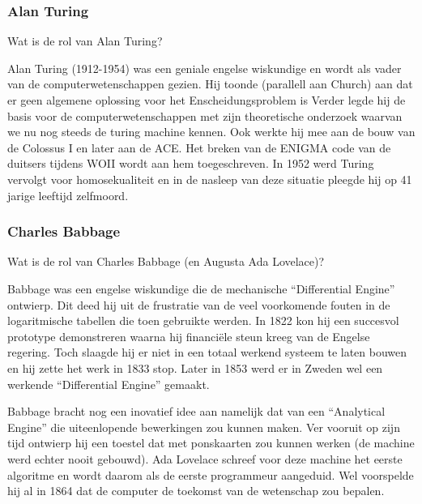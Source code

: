 \documentclass[../main.tex]{subfiles}
\begin{document}
\subsubsection{Alan Turing}
\begin{question}
Wat is de rol van Alan Turing?
\end{question}
\begin{solution}
Alan Turing (1912-1954) was een geniale engelse wiskundige en wordt als vader van de computerwetenschappen gezien.
Hij toonde (parallell aan Church) aan dat er geen algemene oplossing voor het Enscheidungsproblem is
Verder legde hij de basis voor de computerwetenschappen met zijn theoretische onderzoek waarvan we nu nog steeds de turing machine kennen.
Ook werkte hij mee aan de bouw van de Colossus I en later aan de ACE.
Het breken van de ENIGMA code van de duitsers tijdens WOII wordt aan hem toegeschreven.
In 1952 werd Turing vervolgt voor homosekualiteit en in de nasleep van deze situatie pleegde hij op 41 jarige leeftijd zelfmoord.

\end{solution}


\subsubsection{Charles Babbage}
\begin{question}
Wat is de rol van Charles Babbage (en Augusta Ada Lovelace)?
\end{question}
\begin{solution}
Babbage was een engelse wiskundige die de mechanische ``Differential Engine'' ontwierp.
Dit deed hij uit de frustratie van de veel voorkomende fouten in de logaritmische tabellen die toen gebruikte werden.
In 1822 kon hij een succesvol prototype demonstreren waarna hij financi\"ele steun kreeg van de Engelse regering.
Toch slaagde hij er niet in een totaal werkend systeem te laten bouwen en hij zette het werk in 1833 stop.
Later in 1853 werd er in Zweden wel een werkende ``Differential Engine'' gemaakt. 

Babbage bracht nog een inovatief idee aan namelijk dat van een ``Analytical Engine'' die uiteenlopende bewerkingen zou kunnen maken.
Ver vooruit op zijn tijd ontwierp hij een toestel dat met ponskaarten zou kunnen werken (de machine werd echter nooit gebouwd).
Ada Lovelace schreef voor deze machine het eerste algoritme en wordt daarom als de eerste programmeur aangeduid.
Wel voorspelde hij al in 1864 dat de computer de toekomst van de wetenschap zou bepalen.


\end{solution}
\end{document}
